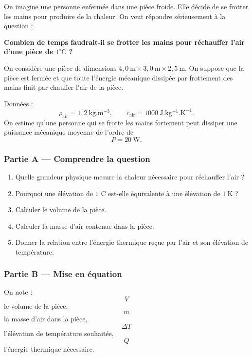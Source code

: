 \documentclass[11pt,a4paper]{article}
\begin{document}
\begin{exercicebox}
On imagine une personne enfermée dans une pièce froide. Elle décide de se frotter les mains pour produire de la chaleur. On veut répondre sérieusement à la question :

\begin{center}
\textbf{Combien de temps faudrait-il se frotter les mains pour réchauffer l'air d'une pièce de \(1^\circ\mathrm C\) ?}
\end{center}

On considère une pièce de dimensions \(4{,}0\ \mathrm m \times 3{,}0\ \mathrm m \times 2{,}5\ \mathrm m\). On suppose que la pièce est fermée et que toute l'énergie mécanique dissipée par frottement des mains finit par chauffer l'air de la pièce.

Données :
\[
\rho_{\mathrm{air}}=1{,}2\ \mathrm{kg.m^{-3}},
\qquad
c_{\mathrm{air}}=1000\ \mathrm{J.kg^{-1}.K^{-1}}.
\]
On estime qu'une personne qui se frotte les mains fortement peut dissiper une puissance mécanique moyenne de l'ordre de
\[
P=20\ \mathrm W.
\]
\end{exercicebox}

\subsubsection*{Partie A — Comprendre la question}

\begin{enumerate}
  \item Quelle grandeur physique mesure la chaleur nécessaire pour réchauffer l'air ?
  \item Pourquoi une élévation de \(1^\circ\mathrm C\) est-elle équivalente à une élévation de \(1\ \mathrm K\) ?
  \item Calculer le volume de la pièce.
  \item Calculer la masse d'air contenue dans la pièce.
  \item Donner la relation entre l'énergie thermique reçue par l'air et son élévation de température.
\end{enumerate}

\subsubsection*{Partie B — Mise en équation}

On note :
\[
V
\]
le volume de la pièce,
\[
m
\]
la masse d'air dans la pièce,
\[
\Delta T
\]
l'élévation de température souhaitée,
\[
Q
\]
l'énergie thermique nécessaire.
\end{document}
